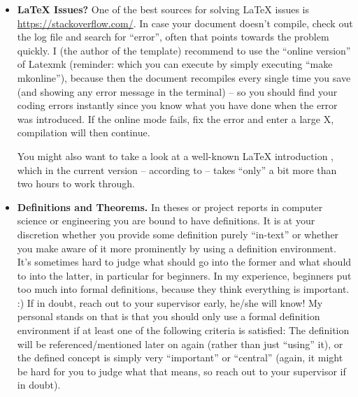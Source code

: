 \begin{itemize}
  In addition to the commands \verb!citep{}! and \verb!cite{}!, \verb!\citeauthor{}! is sometimes useful. This just lists the author(s), but without the year. I.e., it's an alternative  to \verb!cite{}! that you should use when you want to mention the authors whereas you used similar citations before so that there is just no need to add the year again.
  
  Also note that you can easily cite multiple works with one command as shown in (the code of) this sentence \citep{Cooper2015SuperfluidVacuumTheory,Smith2021Wubalubadubdub}.

  
  \item \textbf{\LaTeX{} Issues?} One of the best sources for solving \LaTeX{} issues is \url{https://stackoverflow.com/}. In case your document doesn't compile, check out the log file and search for ``error'', often that points towards the problem quickly. I (the author of the template) recommend to use the ``online version'' of Latexmk (reminder: which you can execute by simply executing ``make mkonline''), because then the document recompiles every single time you save (and showing any error message in the terminal) -- so you should find your coding errors instantly since you know what you have done when the error was introduced. If the online mode fails, fix the error and enter a large X, compilation will then continue.

  You might also want to take a look at a well-known \LaTeX{} introduction \citep{Oetiker2021LatexIntroduction}, which in the current version -- according to \citeauthor{Oetiker2021LatexIntroduction} -- takes ``only'' a bit more than two hours to work through.

  \item \textbf{Definitions and Theorems.} In theses or project reports in computer science or engineering you are bound to have definitions. It is at your discretion whether you provide some definition purely ``in-text'' or whether you make aware of it more prominently by using a definition environment. It's sometimes hard to judge what should go into the former and what should to into the latter, in particular for beginners. In my experience, beginners put too much into formal definitions, because they think everything is important. :) If in doubt, reach out to your supervisor early, he/she will know! My personal stands on that is that you should only use a formal definition environment if at least one of the following criteria is satisfied: The definition will be referenced/mentioned later on again (rather than just ``using'' it), or the defined concept is simply very ``important'' or ``central'' (again, it might be hard for you to judge what that means, so reach out to your supervisor if in doubt).


\end{itemize}
